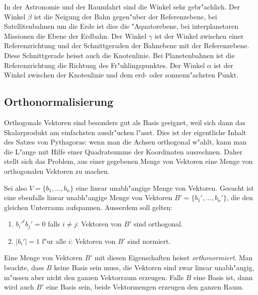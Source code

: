 In der Astronomie und der Raumfahrt sind die Winkel sehr gebr"achlich.
Der Winkel $\beta$ ist die Neigung der Bahn gegen"uber der Referenzebene,
bei Satellitenbahnen um die Erde ist dies die "Aquatorebene,
bei interplanetaren Missionen die Ebene der Erdbahn.
Der Winkel $\gamma$ ist der Winkel zwischen einer Referenzrichtung
und der Schnittgeraden der Bahnebene mit der Referenzebene.
Diese Schnittgerade heisst auch die Knotenlinie.
Bei Planetenbahnen ist die Referenzrichtung die Richtung des Fr"uhlingspunktes.
Der Winkel $\alpha$ ist der Winkel zwischen der Knotenlinie und dem
erd- oder sonnenn"achsten Punkt.



\subsection{Orthonormalisierung}
Orthogonale Vektoren sind besonders gut als Basis geeignet, weil
sich dann das Skalarprodukt am einfachsten ausdr"ucken l"asst.
Dies ist der eigentliche Inhalt des Satzes von Pythagoras: wenn
man die Achsen orthogonal w"ahlt, kann man die L"ange mit Hilfe
einer Quadratsumme der Koordinaten ausrechnen.
Daher stellt sich 
das Problem, aus einer gegebenen Menge von Vektoren eine Menge
von orthogonalen Vektoren zu machen.

Sei also $V=\{b_1,\dots,b_n\}$ eine linear unabh"angige Menge von
Vektoren.
Gesucht ist eine ebenfalls linear unabh"angige Menge 
von Vektoren $B'=\{b_1',\dots,b_n'\}$, die den gleichen Unterraum
aufspannen.
Ausserdem soll gelten:
\begin{enumerate}
\item $b_i'^tb_j'=0$ falls $i\ne j$: Vektoren von $B'$ sind orthogonal.
\item $|b_i'|=1$ f"ur alle $i$: Vektoren von $B'$ sind normiert.
\end{enumerate}
Eine Menge von Vektoren $B'$ mit diesen Eigenschaften heisst
{\it orthonormiert}.
Man beachte, dass $B$ keine Basis sein muss, die Vektoren sind zwar
linear unabh"angig, m"ussen aber nicht den ganzen Vektorraum erzeugen.
Falls $B$ eine Basis ist, dann wird auch $B'$ eine Basis sein, beide
Vektormengen erzeugen den ganzen Raum.

